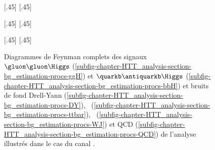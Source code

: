 \begin{figure}[h]
\centering

\vspace{\baselineskip}

[.45\textwidth]
{\vspace{\baselineskip}}
\hfill
{}[.45\textwidth]
{\vspace{\baselineskip}}

\vspace{2\baselineskip}

[.45\textwidth]
{\vspace{\baselineskip}}
\hfill
{}[.45\textwidth]
{\vspace{\baselineskip}}

\vspace{2\baselineskip}

[.45\textwidth]
{\vspace{\baselineskip}}
\hfill
{}[.45\textwidth]
{\vspace{\baselineskip}}

\caption[Diagrammes de Feynman des signaux et principaux bruits de fond de l'analyse.]{Diagrammes de Feynman complets des signaux $\gluon\gluon\Higgs$ (\ref{subfig-chapter-HTT_analysis-section-bg_estimation-procs-ggH}) et $\quarkb\antiquarkb\Higgs$ (\ref{subfig-chapter-HTT_analysis-section-bg_estimation-procs-bbH}) et bruits de fond Drell-Yann (\ref{subfig-chapter-HTT_analysis-section-bg_estimation-procs-DY}), \ttbar\ (\ref{subfig-chapter-HTT_analysis-section-bg_estimation-procs-ttbar}), \Wjets\ (\ref{subfig-chapter-HTT_analysis-section-bg_estimation-procs-WJ}) et QCD (\ref{subfig-chapter-HTT_analysis-section-bg_estimation-procs-QCD}) de l'analyse illustrés dans le cas du canal \mu\tauh.}
\label{fig-chapter-HTT_analysis-section-bg_estimation-procs}
\end{figure}
